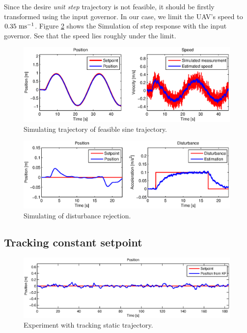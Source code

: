 Since the desire \emph{unit step} trajectory is not feasible, it should be firstly transformed using the input governor. In our case, we limit the UAV's speed to $0.35~\mathrm{ms^{-1}}$. Figure \ref{fig:simulation_step_governor} shows the Simulation of step response with the input governor. See that the speed lies roughly under the limit. 

\begin{figure}[H]
\centering
\includegraphics[width=0.99\textwidth]{fig/simulation3_sine.eps}
\caption{Simulating trajectory of feasible sine trajectory.}
\label{fig:simulation_step_governor}
\end{figure}

\begin{figure}[H]
\centering
\includegraphics[width=0.99\textwidth]{fig/simulation4_disturbance_rejection.eps}
\caption{Simulating of disturbance rejection.}
\label{fig:simulation_step_governor}
\end{figure}

\subsection{Tracking constant setpoint}

\begin{figure}[H]
\centering
\includegraphics[width=0.99\textwidth]{fig/experiment6_constant_reference.eps}
\caption{Experiment with tracking static trajectory.}
\label{fig:experiment_sine_1}
\end{figure}

